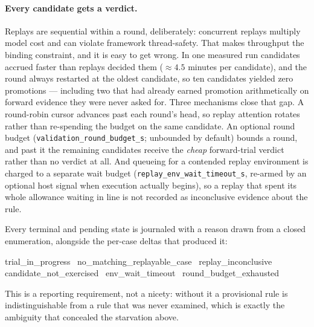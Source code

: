 \documentclass[11pt,letterpaper]{article}
\begin{document}
\paragraph{Every candidate gets a verdict.}
Replays are sequential within a round, deliberately: concurrent replays multiply model cost and can
violate framework thread-safety. That makes throughput the binding constraint, and it is easy to get
wrong. In one measured run candidates accrued faster than replays decided them ($\approx4.5$ minutes
per candidate), and the round always restarted at the oldest candidate, so ten candidates yielded
zero promotions --- including two that had already earned promotion arithmetically on forward
evidence they were never asked for. Three mechanisms close that gap. A round-robin cursor advances
past each round's head, so replay attention rotates rather than re-spending the budget on the same
candidate. An optional round budget (\texttt{validation\_round\_budget\_s}; unbounded by default)
bounds a round, and past it the remaining candidates receive the \emph{cheap} forward-trial verdict
rather than no verdict at all. And queueing for a contended replay environment is charged to a
separate wait budget (\texttt{replay\_env\_wait\_timeout\_s}, re-armed by an optional host signal when
execution actually begins), so a replay that spent its whole allowance waiting in line is not
recorded as inconclusive evidence about the rule.

Every terminal and pending state is journaled with a reason drawn from a closed enumeration,
alongside the per-case deltas that produced it:
\begin{center}\footnotesize\ttfamily
trial\_in\_progress \textperiodcentered\ no\_matching\_replayable\_case
\textperiodcentered\ replay\_inconclusive\\
candidate\_not\_exercised \textperiodcentered\ env\_wait\_timeout
\textperiodcentered\ round\_budget\_exhausted
\end{center}
This is a
reporting requirement, not a nicety: without it a provisional rule is indistinguishable from a rule
that was never examined, which is exactly the ambiguity that concealed the starvation above.
\end{document}
